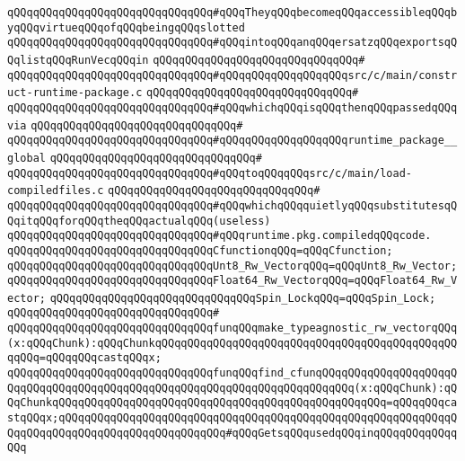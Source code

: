 \verb|qQQqqQQqqQQqqQQqqQQqqQQqqQQqqQQq#qQQqTheyqQQqbecomeqQQqaccessibleqQQqbyqQQqvirtueqQQqofqQQqbeingqQQqslotted|\newline
\verb|qQQqqQQqqQQqqQQqqQQqqQQqqQQqqQQq#qQQqintoqQQqanqQQqersatzqQQqexportsqQQqlistqQQqRunVecqQQqin|\newline
\verb|qQQqqQQqqQQqqQQqqQQqqQQqqQQqqQQq#|\newline
\verb|qQQqqQQqqQQqqQQqqQQqqQQqqQQqqQQq#qQQqqQQqqQQqqQQqqQQqsrc/c/main/construct-runtime-package.c|\newline
\verb|qQQqqQQqqQQqqQQqqQQqqQQqqQQqqQQq#|\newline
\verb|qQQqqQQqqQQqqQQqqQQqqQQqqQQqqQQq#qQQqwhichqQQqisqQQqthenqQQqpassedqQQqvia|\newline
\verb|qQQqqQQqqQQqqQQqqQQqqQQqqQQqqQQq#|\newline
\verb|qQQqqQQqqQQqqQQqqQQqqQQqqQQqqQQq#qQQqqQQqqQQqqQQqqQQqruntime_package__global|\newline
\verb|qQQqqQQqqQQqqQQqqQQqqQQqqQQqqQQq#|\newline
\verb|qQQqqQQqqQQqqQQqqQQqqQQqqQQqqQQq#qQQqtoqQQqqQQqsrc/c/main/load-compiledfiles.c|\newline
\verb|qQQqqQQqqQQqqQQqqQQqqQQqqQQqqQQq#|\newline
\verb|qQQqqQQqqQQqqQQqqQQqqQQqqQQqqQQq#qQQqwhichqQQqquietlyqQQqsubstitutesqQQqitqQQqforqQQqtheqQQqactualqQQq(useless)|\newline
\verb|qQQqqQQqqQQqqQQqqQQqqQQqqQQqqQQq#qQQqruntime.pkg.compiledqQQqcode.|\newline
\newline
\verb|qQQqqQQqqQQqqQQqqQQqqQQqqQQqqQQqCfunctionqQQq=qQQqCfunction;|\newline
\verb|qQQqqQQqqQQqqQQqqQQqqQQqqQQqqQQqUnt8_Rw_VectorqQQq=qQQqUnt8_Rw_Vector;|\newline
\verb|qQQqqQQqqQQqqQQqqQQqqQQqqQQqqQQqFloat64_Rw_VectorqQQq=qQQqFloat64_Rw_Vector;|\newline
\verb|qQQqqQQqqQQqqQQqqQQqqQQqqQQqqQQqSpin_LockqQQq=qQQqSpin_Lock;|\newline
\verb|qQQqqQQqqQQqqQQqqQQqqQQqqQQqqQQq#|\newline
\verb|qQQqqQQqqQQqqQQqqQQqqQQqqQQqqQQqfunqQQqmake_typeagnostic_rw_vectorqQQq(x:qQQqChunk):qQQqChunkqQQqqQQqqQQqqQQqqQQqqQQqqQQqqQQqqQQqqQQqqQQqqQQqqQQq=qQQqqQQqcastqQQqx;|\newline
\verb|qQQqqQQqqQQqqQQqqQQqqQQqqQQqqQQqfunqQQqfind_cfunqQQqqQQqqQQqqQQqqQQqqQQqqQQqqQQqqQQqqQQqqQQqqQQqqQQqqQQqqQQqqQQqqQQqqQQqqQQq(x:qQQqChunk):qQQqChunkqQQqqQQqqQQqqQQqqQQqqQQqqQQqqQQqqQQqqQQqqQQqqQQqqQQq=qQQqqQQqcastqQQqx;qQQqqQQqqQQqqQQqqQQqqQQqqQQqqQQqqQQqqQQqqQQqqQQqqQQqqQQqqQQqqQQqqQQqqQQqqQQqqQQqqQQqqQQqqQQqqQQq#qQQqGetsqQQqusedqQQqinqQQqqQQqqQQqqQQq|\newline
